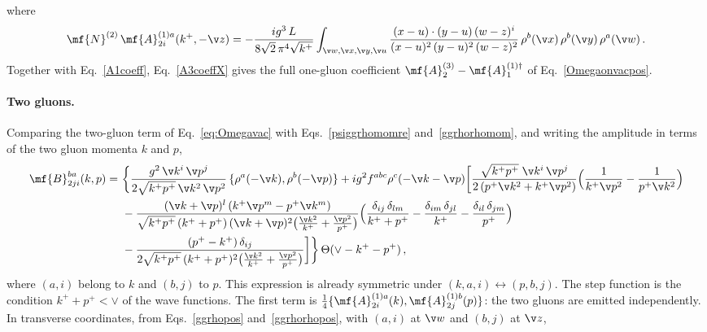 where
\begin{align}
\mf{N}^{(2)}\,\mf{A}^{(1)a}_{2i}(k^{+},-\v z)=-\frac{ig^{3}\,L}{8\sqrt{2}\,\pi^{4}\sqrt{k^{+}}}
\int_{\v w,\v x,\v y,\v u}\frac{(x-u)\cdot(y-u)\,(w-z)^{i}}{(x-u)^{2}\,(y-u)^{2}\,(w-z)^{2}}\,
\rho^{b}(\v x)\,\rho^{b}(\v y)\,\rho^{a}(\v w)\,.
\end{align}
Together with Eq.~\eqref{A1coeff}, Eq.~\eqref{A3coeffX} gives the full one-gluon coefficient
$\mf{A}^{(3)}_{2}-\mf{A}^{(1)\dagger}_{1}$ of Eq.~\eqref{Omegaonvacpos}.

\paragraph{Two gluons.}
Comparing the two-gluon term of Eq.~\eqref{eq:Omegavac} with Eqs.~\eqref{psiggrhomomre}
and~\eqref{ggrhorhomom}, and writing the amplitude in terms of the two gluon momenta $k$ and $p$,
\begin{align}\label{B2coeffM}
\mf{B}^{ba}_{2ji}(k,p)=\ &\bigg\{\frac{g^{2}\,\v k^{i}\,\v p^{j}}{2\sqrt{k^{+}p^{+}}\,\v k^{2}\,\v p^{2}}\,
\{\rho^{a}(-\v k),\rho^{b}(-\v p)\}
+ig^{2}f^{abc}\rho^{c}(-\v k-\v p)\bigg[\frac{\sqrt{k^{+}p^{+}}\;\v k^{i}\,\v p^{j}}{2\,(p^{+}\v k^{2}+k^{+}\v p^{2})}
\Big(\frac{1}{k^{+}\v p^{2}}-\frac{1}{p^{+}\v k^{2}}\Big)\notag\\
&-\frac{(\v k+\v p)^{l}\,(k^{+}\v p^{m}-p^{+}\v k^{m})}
{\sqrt{k^{+}p^{+}}\,(k^{+}+p^{+})\,(\v k+\v p)^{2}\big(\frac{\v k^{2}}{k^{+}}+\frac{\v p^{2}}{p^{+}}\big)}
\Big(\frac{\delta_{ij}\,\delta_{lm}}{k^{+}+p^{+}}-\frac{\delta_{im}\,\delta_{jl}}{k^{+}}-\frac{\delta_{il}\,\delta_{jm}}{p^{+}}\Big)\notag\\
&-\frac{(p^{+}-k^{+})\,\delta_{ij}}{2\sqrt{k^{+}p^{+}}\,(k^{+}+p^{+})^{2}\big(\frac{\v k^{2}}{k^{+}}+\frac{\v p^{2}}{p^{+}}\big)}\bigg]\bigg\}\,
\Theta(\vee-k^{+}-p^{+})\,,
\end{align}
where $(a,i)$ belong to $k$ and $(b,j)$ to $p$. This expression is already symmetric under
$(k,a,i)\leftrightarrow(p,b,j)$. The step function is the condition $k^{+}+p^{+}<\vee$ of the wave
functions. The first term is $\frac{1}{4}\{\mf{A}^{(1)a}_{2i}(k),\mf{A}^{(1)b}_{2j}(p)\}$: the two gluons are
emitted independently. In transverse coordinates, from Eqs.~\eqref{ggrhopos} and~\eqref{ggrhorhopos}, with
$(a,i)$ at $\v w$ and $(b,j)$ at $\v z$,
